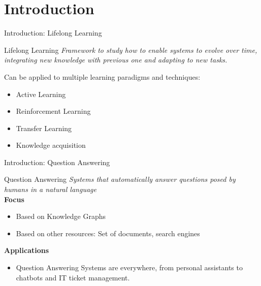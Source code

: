 \documentclass{beamer}
\begin{document}
\section{Introduction}
\begin{frame}{Introduction: Lifelong Learning}
  \begin{block}{Lifelong Learning}
    \vspace{0.2cm}
    \textit{Framework to study how to enable systems to evolve over time, integrating new knowledge with previous one and adapting to new tasks.} \par

    Can be applied to multiple learning paradigms and techniques:
    \begin{itemize}
      \item Active Learning
      \item Reinforcement Learning
      \item Transfer Learning
      \item Knowledge acquisition
    \end{itemize}
  \end{block}
\end{frame}

\begin{frame}{Introduction: Question Answering}
  \begin{block}{Question Answering}
    \vspace{0.2cm}
    \textit{Systems that automatically answer questions posed by humans in a natural language} \\
    \vspace{0.2cm}
    \alert{\textbf{Focus}}
    \begin{itemize}
      \item Based on Knowledge Graphs
      \item Based on other resources: Set of documents, search engines
    \end{itemize}
    \alert{\textbf{Applications}}
    \begin{itemize}
      \item Question Answering Systems are everywhere, from personal assistants to chatbots and IT ticket management.
    \end{itemize}
  \end{block}
\end{frame}

\end{document}
